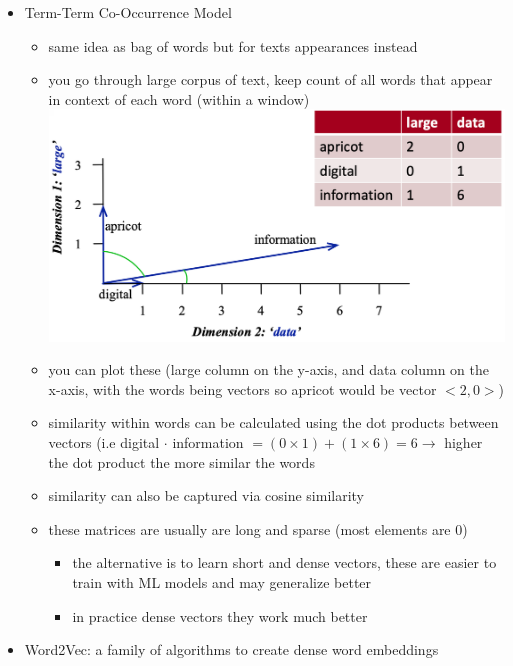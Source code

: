 \documentclass[10.5pt,a4paper, fleqn, dvipsnames]{article}
\begin{document}
\begin{itemize}
\begin{itemize}
    \end{itemize} 
    \newpage 
    \item Term-Term Co-Occurrence Model 
    \begin{itemize}
        \item same idea as bag of words but for texts appearances instead
        \item you go through large corpus of text, keep count of all words that appear in context of each word (within a window) \\ 
        \includegraphics[scale = 0.3]{term-term-matrix.png}
        \item you can plot these (large column on the y-axis, and data column on the x-axis, with the words being vectors so apricot would be vector $<2,0>$) 
        \item similarity within words can be calculated using the dot products between vectors (i.e digital $\cdot$ information $= (0 \times 1) + (1 \times 6) = 6 \longrightarrow$ higher the dot product the more similar the words 
        \item similarity can also be captured via cosine similarity
        \item these matrices are usually are long and sparse (most elements are 0)
        \begin{itemize}[leftmargin = 2em]
            \item the alternative is to learn short and dense vectors, these are easier to train with ML models and may generalize better
            \item in practice dense vectors they work much better 
        \end{itemize}
    \end{itemize}
    \item Word2Vec: a family of algorithms to create dense word embeddings 
    \begin{itemize}

\end{itemize}
\end{itemize}
\end{document}
